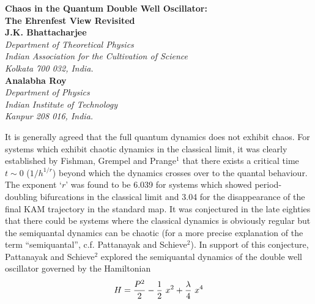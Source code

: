 


\thispagestyle{empty}
\begin{center}
{\Large	\bf Chaos in the Quantum Double Well Oscillator:\\
The Ehrenfest View Revisited} \\
\vspace{.6in}
{\bf J.K. Bhattacharjee} \\
\vspace{0.1in}
{\sl Department of Theoretical Physics} \\
{\sl Indian Association for the Cultivation of Science} \\
{\sl Kolkata 700 032, India.}  \\
\vspace{0.4in}
{\bf Analabha Roy} \\
\vspace{0.1in}
{\sl Department of Physics} \\
{\sl Indian Institute of Technology} \\
{\sl Kanpur 208 016, India.} \\
\vspace{.8in}
\end{center}
\begin{abstract}
We treat the double well quantum oscillator from the standpoint of the 
Ehrenfest equation but in a manner different from Pattanayak and
Schieve. We show that for short times there can be chaotic motion due
to quantum fluctuations, but over sufficiently long times the
behaviour is normal. 
\end{abstract}

\newpage
\baselineskip 24pt

It is generally agreed that the full quantum dynamics does not exhibit 
chaos. For systems which exhibit chaotic dynamics in the classical
limit, it was clearly established by Fishman, Grempel and Prange$^1$
that there exists a critical time $t \sim 0$ ($1/h^{1/r}$) beyond
which the dynamics crosses over to the quantal behaviour. The exponent 
`$r$' was found to be 6.039 for systems which showed period-doubling
bifurcations in the classical limit and 3.04 for the disappearance of
the final KAM trajectory in the standard map. It was conjectured in
the late eighties that there could be systems where the classical
dynamics is obviously regular but the semiquantal dynamics can be
chaotic (for a more precise explanation of the term ``semiquantal'',
c.f. Pattanayak and Schieve$^2$). In support of this conjecture,
Pattanayak and Schieve$^2$ explored the semiquantal dynamics of the
double well oscillator governed by the Hamiltonian
$$
H = {P^2 \over 2} - {1 \over 2} \ x^2 + {\lambda \over 4} \ x^4
$$

